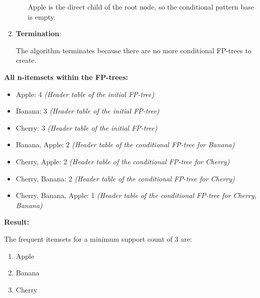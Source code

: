 \documentclass[
english,
smallborders
]{i6prcsht}
\begin{document}
\begin{solution}
\begin{enumerate}
\begin{enumerate}
			            Apple is the direct child of the root node, so the conditional pattern base is empty.

		      \end{enumerate}

		\item \textbf{Termination}:

		      The algorithm terminates because there are no more conditional FP-trees to create.


	\end{enumerate}

	\textbf{All n-itemsets within the FP-trees:}

	\begin{itemize}
		\item Apple: 4 \textit{(Header table of the initial FP-tree)}
		\item Banana: 3 \textit{(Header table of the initial FP-tree)}
		\item Cherry: 3 \textit{(Header table of the initial FP-tree)}
		\item Banana, Apple: 2 \textit{(Header table of the conditional FP-tree for Banana)}
		\item Cherry, Apple: 2 \textit{(Header table of the conditional FP-tree for Cherry)}
		\item Cherry, Banana: 2 \textit{(Header table of the conditional FP-tree for Cherry)}
		\item Cherry, Banana, Apple: 1 \textit{(Header table of the conditional FP-tree for Cherry, Banana)}
	\end{itemize}

	\textbf{Result:}

	\vspace*{-0.2cm}

	The frequent itemsets for a minimum support count of 3 are:

	\begin{multicols}{3}
		\begin{enumerate}
			\item Apple
			\item Banana
			\item Cherry
		\end{enumerate}
	\end{multicols}

\end{solution}
\end{document}
